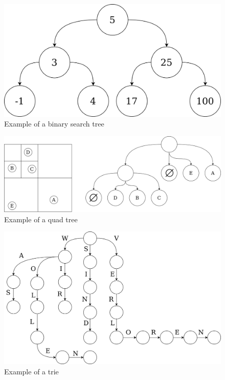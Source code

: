 \documentclass[times, dvipsnames,%
               languages={russian,english} %
              ]{itmo-student-thesis}
\begin{document}
\begin{figure}[H]
  \centering
  \caption{Example of a binary search tree}
  \label{bin-search-tree-pic}
  \includegraphics[width=\linewidth]{pics/bin-search-tree.png}
\end{figure}

\begin{figure}[H]
  \centering
  \caption{Example of a quad tree}
  \label{quad-tree-pic}
  \includegraphics[width=\linewidth]{pics/quad-tree.png}
\end{figure}

\begin{figure}[H]
  \centering
  \caption{Example of a trie}
  \label{trie-pic}
  \includegraphics[width=\linewidth]{pics/trie.png}
\end{figure}
\end{document}
